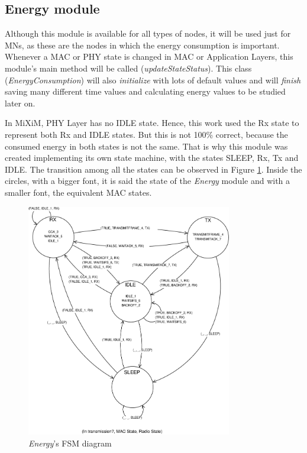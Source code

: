 \subsection{Energy module}

Although this module is available for all types of nodes, it will be used just for \acp{MN}, as these are the nodes in which the energy 
consumption is important. Whenever a \ac{MAC} or \ac{PHY} state is 
changed in \ac{MAC} or Application Layers, this module's main method will be called (\textit{updateStateStatus}). This class 
(\textit{EnergyConsumption}) will also \textit{initialize} with lots of default values and will \textit{finish} saving many different 
time values and calculating energy values to be studied later on.

In \ac{MiXiM}, \ac{PHY} Layer has no IDLE state. Hence, this work used the \ac{Rx} state to represent both \ac{Rx} and IDLE states. But this is
not 100\% correct, because the consumed energy in both states is not the same. That is why this module was created implementing its own state machine,
with the states SLEEP, \ac{Rx}, \ac{Tx} and IDLE. The transition among all the states can be observed in Figure \ref{fig:statesDiagramEnergy}. 
Inside the circles, with a bigger font, it is said the state of the \textit{Energy} module and with a smaller font, the equivalent \ac{MAC} 
states.

\begin{figure}[ht]
 \begin{center}
  \includegraphics[width=0.8\textwidth]{statesDiagramEnergy.eps}
 \end{center}
 \caption{\textit{Energy}'s \ac{FSM} diagram}
 \label{fig:statesDiagramEnergy}
\end{figure}

